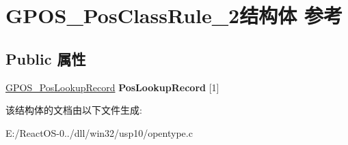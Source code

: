 \hypertarget{struct_g_p_o_s___pos_class_rule__2}{}\section{G\+P\+O\+S\+\_\+\+Pos\+Class\+Rule\+\_\+2结构体 参考}
\label{struct_g_p_o_s___pos_class_rule__2}
\subsection*{Public 属性}
\begin{DoxyCompactItemize}
\item 
\mbox{\label{struct_g_p_o_s___pos_class_rule__2_a68a1e885d25cb4e3e5540154997e3b1b}} 
\hyperlink{struct_g_p_o_s___pos_lookup_record}{G\+P\+O\+S\+\_\+\+Pos\+Lookup\+Record} {\bfseries Pos\+Lookup\+Record} \mbox{[}1\mbox{]}
\end{DoxyCompactItemize}


该结构体的文档由以下文件生成\+:\begin{DoxyCompactItemize}
\item 
E\+:/\+React\+O\+S-\/0../dll/win32/usp10/opentype.\+c\end{DoxyCompactItemize}
